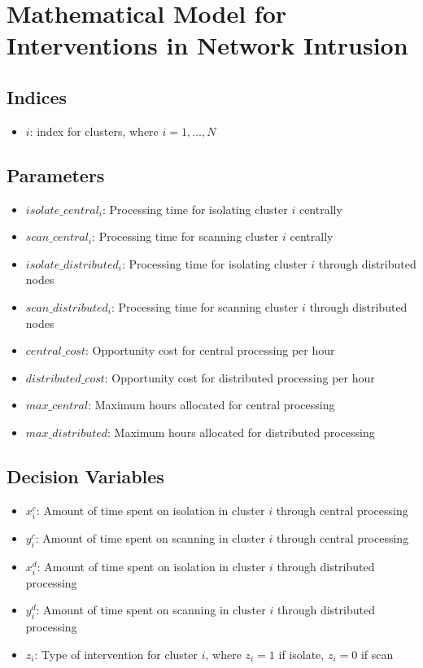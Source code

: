 \documentclass{article}
\begin{document}
\section*{Mathematical Model for Interventions in Network Intrusion}

\subsection*{Indices}
\begin{itemize}
    \item $i$: index for clusters, where \( i = 1, \ldots, N \)
\end{itemize}

\subsection*{Parameters}
\begin{itemize}
    \item $isolate\_central_i$: Processing time for isolating cluster \( i \) centrally
    \item $scan\_central_i$: Processing time for scanning cluster \( i \) centrally
    \item $isolate\_distributed_i$: Processing time for isolating cluster \( i \) through distributed nodes
    \item $scan\_distributed_i$: Processing time for scanning cluster \( i \) through distributed nodes
    \item $central\_cost$: Opportunity cost for central processing per hour
    \item $distributed\_cost$: Opportunity cost for distributed processing per hour
    \item $max\_central$: Maximum hours allocated for central processing
    \item $max\_distributed$: Maximum hours allocated for distributed processing
\end{itemize}

\subsection*{Decision Variables}
\begin{itemize}
    \item $x_{i}^c$: Amount of time spent on isolation in cluster \( i \) through central processing
    \item $y_{i}^c$: Amount of time spent on scanning in cluster \( i \) through central processing
    \item $x_{i}^d$: Amount of time spent on isolation in cluster \( i \) through distributed processing
    \item $y_{i}^d$: Amount of time spent on scanning in cluster \( i \) through distributed processing
    \item $z_i$: Type of intervention for cluster \( i \), where \( z_i = 1 \) if isolate, \( z_i = 0 \) if scan
\end{itemize}
\end{document}
